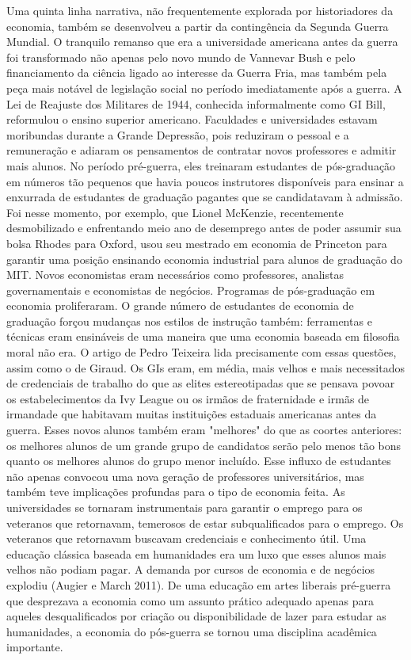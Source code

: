 \documentclass[a4paper,12pt]{article}[abntex2]
\begin{document}
Uma quinta linha narrativa, não frequentemente explorada por historiadores da economia, também se desenvolveu a partir da contingência da Segunda Guerra Mundial. O tranquilo remanso que era a universidade americana antes da guerra foi transformado não apenas pelo novo mundo de Vannevar Bush e pelo financiamento da ciência ligado ao interesse da Guerra Fria, mas também pela peça mais notável de legislação social no período imediatamente após a guerra. A Lei de Reajuste dos Militares de 1944, conhecida informalmente como GI Bill, reformulou o ensino superior americano. Faculdades e universidades estavam moribundas durante a Grande Depressão, pois reduziram o pessoal e a remuneração e adiaram os pensamentos de contratar novos professores e admitir mais alunos. No período pré-guerra, eles treinaram estudantes de pós-graduação em números tão pequenos que havia poucos instrutores disponíveis para ensinar a enxurrada de estudantes de graduação pagantes que se candidatavam à admissão. Foi nesse momento, por exemplo, que Lionel McKenzie, recentemente desmobilizado e enfrentando meio ano de desemprego antes de poder assumir sua bolsa Rhodes para Oxford, usou seu mestrado em economia de Princeton para garantir uma posição ensinando economia industrial para alunos de graduação do MIT. Novos economistas eram necessários como professores, analistas governamentais e economistas de negócios. Programas de pós-graduação em economia proliferaram. O grande número de estudantes de economia de graduação forçou mudanças nos estilos de instrução também: ferramentas e técnicas eram ensináveis de uma maneira que uma economia baseada em filosofia moral não era. O artigo de Pedro Teixeira lida precisamente com essas questões, assim como o de Giraud. Os GIs eram, em média, mais velhos e mais necessitados de credenciais de trabalho do que as elites estereotipadas que se pensava povoar os estabelecimentos da Ivy League ou os irmãos de fraternidade e irmãs de irmandade que habitavam muitas instituições estaduais americanas antes da guerra. Esses novos alunos também eram "melhores" do que as coortes anteriores: os melhores alunos de um grande grupo de candidatos serão pelo menos tão bons quanto os melhores alunos do grupo menor incluído. Esse influxo de estudantes não apenas convocou uma nova geração de professores universitários, mas também teve implicações profundas para o tipo de economia feita. As universidades se tornaram instrumentais para garantir o emprego para os veteranos que retornavam, temerosos de estar subqualificados para o emprego. Os veteranos que retornavam buscavam credenciais e conhecimento útil. Uma educação clássica baseada em humanidades era um luxo que esses alunos mais velhos não podiam pagar. A demanda por cursos de economia e de negócios explodiu (Augier e March 2011). De uma educação em artes liberais pré-guerra que desprezava a economia como um assunto prático adequado apenas para aqueles desqualificados por criação ou disponibilidade de lazer para estudar as humanidades, a economia do pós-guerra se tornou uma disciplina acadêmica importante.
\end{document}
